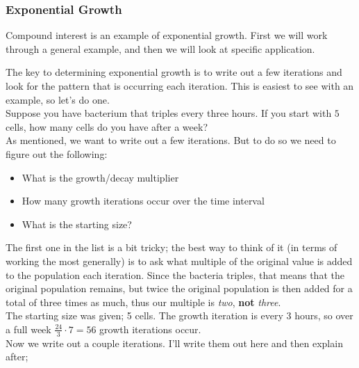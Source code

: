 \documentclass{ximera}
\begin{document}
    \subsubsection*{Exponential Growth}
    
        Compound interest is an example of exponential growth. First we will work through a general example, and then we will look at specific application. 
        
        \begin{explanation}%
        
            The key to determining exponential growth is to write out a few iterations and look for the pattern that is occurring each iteration. This is easiest to see with an example, so let's do one. \\
            Suppose you have bacterium that triples every three hours. If you start with $5$ cells, how many cells do you have after a week?\\
            As mentioned, we want to write out a few iterations. But to do so we need to figure out the following:
            \begin{itemize}
                \item What is the growth/decay multiplier
                \item How many growth iterations occur over the time interval
                \item What is the starting size?
            \end{itemize}
            The first one in the list is a bit tricky; the best way to think of it (in terms of working the most generally) is to ask what multiple of the original value is added to the population each iteration. Since the bacteria triples, that means that the original population remains, but twice the original population is then added for a total of three times as much, thus our multiple is \textit{two}, \textbf{not} \textit{three}.\\
            The starting size was given; 5 cells. The growth iteration is every 3 hours, so over a full week $\frac{24}{3}\cdot 7 = 56$ growth iterations occur.\\
            
            Now we write out a couple iterations. I'll write them out here and then explain after;
            

\end{explanation}
\end{document}
